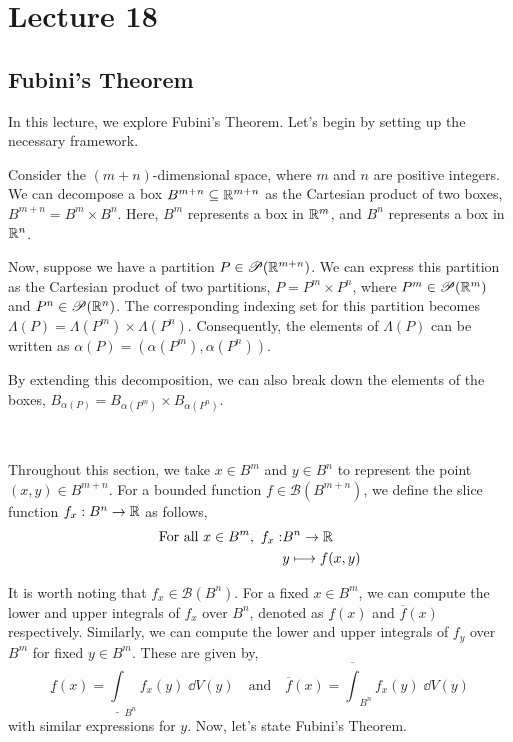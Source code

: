 \documentclass[../Analysis-3.tex]{subfiles}
\begin{document}
\chapter*{Lecture 18} %
\setcounter{chapter}{18} %
\setcounter{section}{0}

\section{Fubini's Theorem}

In this lecture, we explore Fubini's Theorem. Let's begin by setting up the necessary framework.

\ssk

Consider the $(m+n)$-dimensional space, where $m$ and $n$ are positive integers. We can decompose a box $B^{m+n} \subseteq \mathbb{R}^{m+n}$ as the Cartesian product of two boxes, $B^{m+n} = B^m \times B^n$. Here, $B^m$ represents a box in $\mathbb{R}^m$, and $B^n$ represents a box in $\mathbb{R}^n$.

\ssk

Now, suppose we have a partition $P \in \mathscr{P}(\mathbb{R}^{m+n})$. We can express this partition as the Cartesian product of two partitions, $P = P^m \times P^n$, where $P^m \in \mathscr{P}(\mathbb{R}^m)$ and $P^n \in \mathscr{P}(\mathbb{R}^n)$. The corresponding indexing set for this partition becomes $\Lambda(P) = \Lambda(P^m) \times \Lambda(P^n)$. Consequently, the elements of $\Lambda(P)$ can be written as $\alpha(P) = (\alpha(P^m), \alpha(P^n))$.

\ssk

By extending this decomposition, we can also break down the elements of the boxes, $B_{\alpha(P)} = B_{\alpha(P^m)} \times B_{\alpha(P^n)}$.

\

Throughout this section, we take $x \in B^m$ and $y \in B^n$ to represent the point $(x,y) \in B^{m+n}$. For a bounded function $f \in \mathscr{B}(B^{m+n})$, we define the slice function $f_x: B^n \to \mathbb{R}$ as follows,
\begin{align*}
  \text{For all } x \in B^m, \ f_x : & B^n \to \mathbb{R}           \\
                                     & y \longmapsto f(x,y)
\end{align*}

It is worth noting that $f_x \in \mathscr{B}(B^n)$. For a fixed $x \in B^m$, we can compute the lower and upper integrals of $f_x$ over $B^n$, denoted as $\underline{f}(x)$ and $\overline{f}(x)$ respectively. Similarly, we can compute the lower and upper integrals of $f_y$ over $B^m$ for fixed $y \in B^m$. These are given by,
\[  \underline{f}(x) = \underline{\int}_{B^n} f_x(y) \; \dd{V(y)} \quad \text{and} \quad \overline{f}(x) = \overline{\int}_{B^n} f_x(y) \; \dd{V(y)}  \]
with similar expressions for $y$. Now, let's state Fubini's Theorem.
\end{document}
